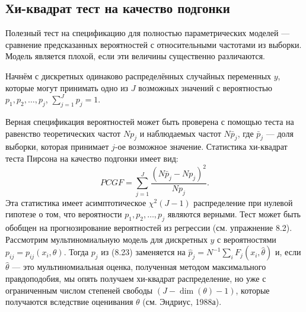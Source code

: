 \subsection{Хи-квадрат тест на качество подгонки}

Полезный тест на спецификацию для полностью параметрических моделей --- сравнение предсказанных вероятностей с относительными частотами из выборки. Модель является плохой, если эти величины существенно различаются.

Начнём с дискретных одинаково распределённых случайных переменных $y$, которые могут принимать одно из $J$ возможных значений с вероятностью $p_1, p_2, \dots, p_j$, $\sum_{j=1}^J p_j = 1$.

Верная спецификация вероятностей может быть проверена с помощью теста на равенство теоретических частот $Np_j$ и наблюдаемых частот $N\bar{p}_j$, где $\bar{p}_j$ --- доля выборки, которая принимает $j$-ое возможное значение. Статистика хи-квадрат теста Пирсона на качество подгонки имеет вид:
\begin{equation}
PCGF = \sum_{j=1}^J \frac{(N\bar{p}_j - Np_j)^2}{Np_j}.
\end{equation}
Эта статистика имеет асимптотическое $\chi^2(J-1)$ распределение при нулевой гипотезе о том, что вероятности $p_1, p_2, \dots, p_j$ являются верными. Тест может быть обобщен на прогнозирование вероятностей из регрессии (см. упражнение 8.2). Рассмотрим мультиномиальную модель для дискретных $y$ с вероятностями $p_{ij} = p_{ij}(x_i, \theta)$. Тогда $p_j$ из (8.23) заменяется на $\hat{p}_j = N^{-1}\sum_i F_j(x_i, \hat{\theta})$ и, если $\hat{\theta}$ --- это мультиномиальная оценка, полученная методом максимального правдоподобия, мы опять получаем хи-квадрат распределение, но уже с ограниченным числом степеней свободы $(J - \dim(\theta) - 1)$, которые получаются вследствие оценивания $\theta$ (см. Эндриус, 1988а).

